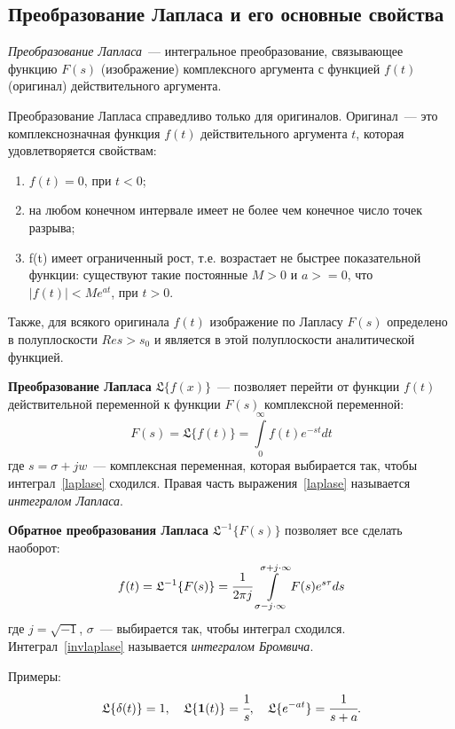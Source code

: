 \subsection{Преобразование Лапласа и его основные свойства}
\textit{Преобразование Лапласа}~--- интегральное преобразование, связывающее функцию $F(s)$ (изображение) комплексного аргумента с функцией $f(t)$ (оригинал) действительного аргумента.

Преобразование Лапласа справедливо только для оригиналов. Оригинал~--- это комплекснозначная функция $f(t)$ действительного аргумента $t$, которая удовлетворяется свойствам:
\begin{enumerate}
    \item $f(t) = 0$, при $t < 0$;
    \item на любом конечном интервале имеет не более чем конечное число точек разрыва;
    \item f(t) имеет ограниченный рост, т.е. возрастает не быстрее показательной функции: существуют такие постоянные $M > 0$ и $a >= 0$, что $|f(t)| < M e^{at}$, при $t > 0$.
\end{enumerate}

Также, для всякого оригинала $f(t)$ изображение по Лапласу $F(s)$ определено в полуплоскости $Re s > s_0$ и является в этой полуплоскости аналитической функцией.

\textbf{Преобразование Лапласа} $\mathfrak{L}\{f(x)\}$~--- позволяет перейти от функции $f(t)$ действительной переменной к функции $F(s)$ комплексной переменной:
\begin{equation}\label{laplase}
    F(s) = \mathfrak{L}\{f(t)\} = \int\limits_{0}^{\infty} f(t) e^{-st} dt
\end{equation}
где $s = \sigma + j w$~--- комплексная переменная, которая выбирается так, чтобы интеграл~\eqref{laplase} сходился. Правая часть выражения~\eqref{laplase} называется \textit{интегралом Лапласа}.

\textbf{Обратное преобразования Лапласа} $\mathfrak{L}^{-1}  \{F(s)\}$ позволяет все сделать наоборот:
\begin{equation}\label{invlaplase}
    f(t) = \mathfrak{L}^{-1}  \{F(s)\} = \cfrac{1}{2 \pi j} \: \int\limits_{\sigma - j \cdot \infty}^{\sigma + j \cdot \infty} F(s) e^{s \tau} ds
\end{equation}
где $j=\sqrt{-1}$, $\sigma$~--- выбирается так, чтобы интеграл сходился. Интеграл~\eqref{invlaplase} называется \textit{интегралом Бромвича}.

Примеры:
\begin{gather*}
    \mathfrak{L}\{\delta(t)\} = 1, \quad
    \mathfrak{L}\{\mathbf{1}(t)\} = \cfrac{1}{s}, \quad
    \mathfrak{L}\{e^{-at}\} = \cfrac{1}{s + a}.
\end{gather*}


